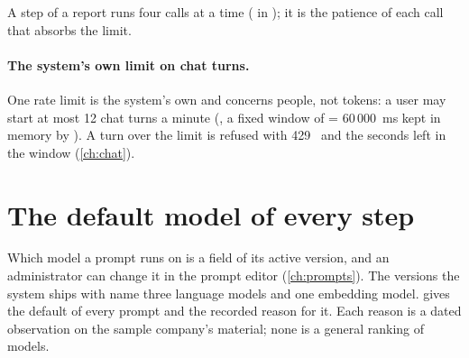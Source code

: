 A step of a report runs four calls at a time ( in
); it is the patience of each call that absorbs the limit.

\paragraph{The system's own limit on chat turns.} One rate limit is the system's own and
concerns people, not tokens: a user may start at most 12 chat turns a minute
(, a fixed window of  = 60\,000~ms kept in
memory by ). A turn over the limit is refused with
429~ and the seconds left in the window (\cref{ch:chat}).


\section{The default model of every step}\label{sec:models:defaults}

Which model a prompt runs on is a field of its active version, and an administrator can
change it in the prompt editor (\cref{ch:prompts}). The versions the system ships with name
three language models and one embedding model.  gives the default of
every prompt and the recorded reason for it. Each reason is a dated observation on the sample
company's material; none is a general ranking of models.

